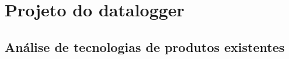 \chapter{Projeto do datalogger}
\label{chap:metodologia}





\section{Análise de tecnologias de produtos existentes}\label{sec:estudo_mercado}




